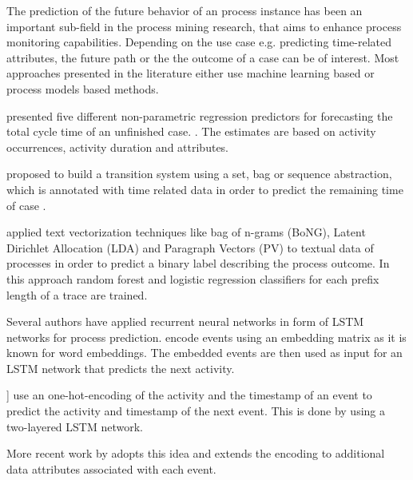 The prediction of the future behavior of an process instance has been an important sub-field in the process mining research, that aims to enhance process monitoring capabilities.
Depending on the use case e.g. predicting time-related attributes, the future path or the the outcome of a case can be of interest. 
Most approaches presented in the literature either use machine learning based or process models based methods.


 presented five different non-parametric regression predictors for forecasting the total cycle time of an unfinished case. \cite{DBLP:conf/otm/DongenCA08}.
The estimates are based on activity occurrences, activity duration and attributes.

 proposed to build a transition system using a set, bag or sequence abstraction, which is annotated with time related data in order to predict the remaining time of case \cite{DBLP:journals/is/AalstSS11}.


\citeauthor{DBLP:conf/bpm/TeinemaaDMF16} applied text vectorization techniques like bag of n-grams (BoNG), Latent Dirichlet Allocation (LDA) and Paragraph Vectors (PV) to textual data of processes in order to predict a binary label describing the process outcome\cite{DBLP:conf/bpm/TeinemaaDMF16}. In this approach random forest and logistic regression classifiers for each prefix length of a trace are trained. 

Several authors have applied recurrent neural networks in form of LSTM networks for process prediction. \citeauthor{ DBLP:conf/bpm/EvermannRF16} encode events using an embedding matrix as it is known for word embeddings. The embedded events are then used as input for an LSTM network that predicts the next activity\cite{DBLP:conf/bpm/EvermannRF16}.

\citeauthor{DBLP:conf/caise/TaxVRD17}] use an one-hot-encoding of the activity and the timestamp of an event to predict the activity and timestamp of the next event. This is done by using a two-layered LSTM network\cite{DBLP:conf/caise/TaxVRD17}.

More recent work by \citeauthor{DBLP:conf/ssci/NavarinVPS17} adopts this idea and extends the encoding to additional data attributes associated with each event\cite{DBLP:conf/ssci/NavarinVPS17}.